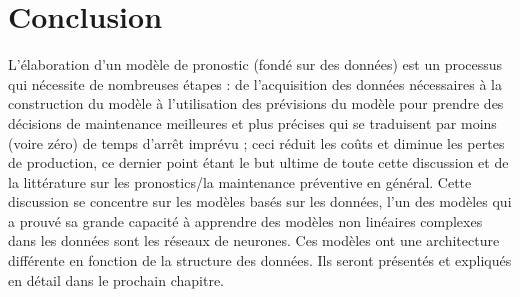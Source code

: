 \section{Conclusion}
L'élaboration d'un modèle de pronostic (fondé sur des données) est un processus qui nécessite de nombreuses étapes : de l'acquisition des données nécessaires à la construction du modèle à l'utilisation des prévisions du modèle pour prendre des décisions de maintenance meilleures et plus précises qui se traduisent par moins (voire zéro) de temps d'arrêt imprévu ; ceci réduit les coûts et diminue les pertes de production, ce dernier point étant le but ultime de toute cette discussion et de la littérature sur les pronostics/la maintenance préventive en général. Cette discussion se concentre sur les modèles basés sur les données, l'un des modèles qui a prouvé sa grande capacité à apprendre des modèles non linéaires complexes dans les données sont les réseaux de neurones. Ces modèles ont une architecture différente en fonction de la structure des données. Ils seront présentés et expliqués en détail dans le prochain chapitre.
